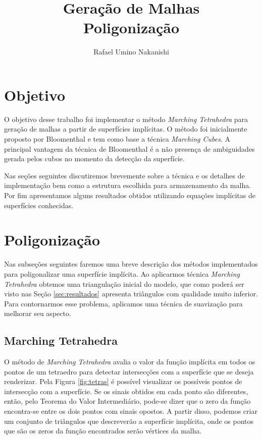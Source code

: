 \documentclass[11pt]{article}
\title{Geração de Malhas\\Poligonização}
\author{Rafael Umino Nakanishi}
\date{}
\begin{document}
	\maketitle
	\section{Objetivo} %
	\label{sec:objetivo}
		O objetivo desse trabalho foi implementar o método \emph{Marching Tetrahedra} para geração de malhas a partir de superfícies implícitas. O método foi inicialmente proposto por Bloomenthal \cite{bloomenthal1994implicit} e tem como base a técnica \emph{Marching Cubes}\cite{lorensen1987marching}. A principal vantagem da técnica de Bloomenthal é a não presença de ambiguidades gerada pelos cubos no momento da detecção da superfície.

		Nas seções seguintes discutiremos brevemente sobre a técnica e os detalhes de implementação bem como a estrutura escolhida para armazenamento da malha. Por fim apresentamos alguns resultados obtidos utilizando equações implícitas de superfícies conhecidas.

	\section{Poligonização} %
		Nas subseções seguintes faremos uma breve descrição dos métodos implementados para poligonalizar uma superfície implícita. Ao aplicarmos técnica \emph{Marching Tetrahedra} obtemos uma triangulação inicial do modelo, que como poderá ser visto nas Seção \ref{sec:resultados} apresenta triângulos com qualidade muito inferior. Para contornarmos esse problema, aplicamos uma técnica de suavização para melhorar seu aspecto.

		\subsection{Marching Tetrahedra}
		\label{sec:marching}
			O método de \emph{Marching Tetrahedra} avalia o valor da função implícita em todos os pontos de um tetraedro para detectar intersecções com a superfície que se deseja renderizar. Pela Figura \ref{fig:tetras} é possível visualizar os possíveis pontos de intersecção com a superfície. Se os sinais obtidos em cada ponto são diferentes, então, pelo Teorema do Valor Intermediário, pode-se dizer que o zero da função encontra-se entre os dois pontos com sinais opostos. A partir disso, podemos criar um conjunto de triângulos que descreverão a superfície implícita, onde os pontos que são os zeros da função encontrados serão vértices da malha.
\end{document}
